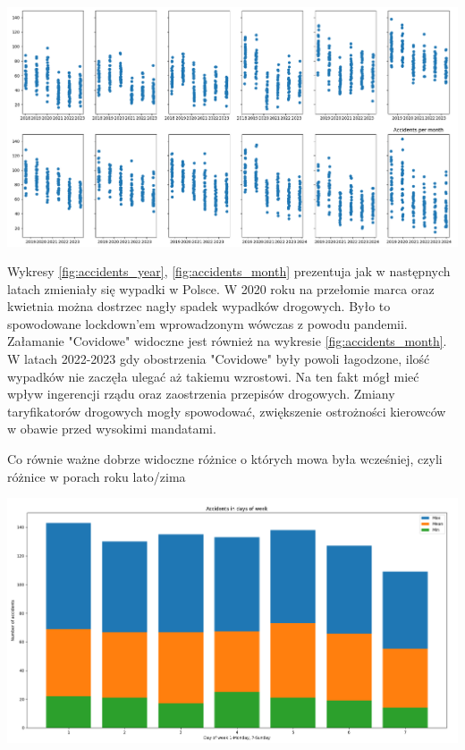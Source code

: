 \documentclass{article}
\begin{document}
\begin{center}
    \includegraphics[scale=0.3]{visualization/accidents_per_month.png}
    \captionsetup{hypcap=false}
    \label{fig:accidents_month}
\end{center}

Wykresy \ref{fig:accidents_year}, \ref{fig:accidents_month} prezentuja jak w następnych latach zmieniały się wypadki w Polsce. W 2020 roku na przełomie marca oraz kwietnia można dostrzec nagły spadek wypadków drogowych. Było to spowodowane lockdown'em wprowadzonym wówczas z powodu pandemii. Załamanie "Covidowe" widoczne jest również na wykresie \ref{fig:accidents_month}. 
W latach 2022-2023 gdy obostrzenia "Covidowe" były powoli łagodzone, ilość wypadków nie zaczęła ulegać aż takiemu wzrostowi. Na ten fakt mógł mieć wpływ ingerencji rządu oraz zaostrzenia przepisów drogowych. Zmiany taryfikatorów drogowych mogły spowodować, zwiększenie ostrożności kierowców w obawie przed wysokimi mandatami.

Co równie ważne dobrze widoczne różnice o których mowa była wcześniej, czyli różnice w porach roku lato/zima

\begin{center}
    \includegraphics[scale=0.3]{visualization/accidents_days_of_week.png}
    \captionsetup{hypcap=false}
    \label{fig:accidents_weeks}
\end{center}
\end{document}
